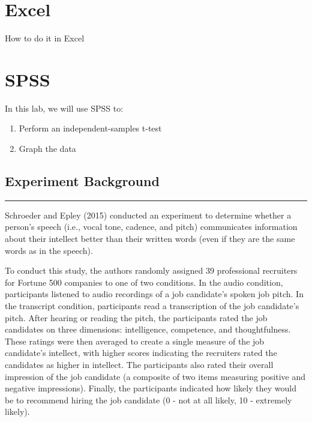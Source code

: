 \documentclass[
]{book}
\providecommand{\tightlist}{%
  \setlength{\itemsep}{0pt}\setlength{\parskip}{0pt}}
\begin{document}
\hypertarget{excel-7}{%
\section{Excel}\label{excel-7}}

How to do it in Excel

\hypertarget{spss-7}{%
\section{SPSS}\label{spss-7}}

In this lab, we will use SPSS to:

\begin{enumerate}
\def\labelenumi{\arabic{enumi}.}
\tightlist
\item
  Perform an independent-samples t-test
\item
  Graph the data
\end{enumerate}

\hypertarget{experiment-background-2}{%
\subsection{Experiment Background}\label{experiment-background-2}}

\begin{center}\rule{0.5\linewidth}{0.5pt}\end{center}

Schroeder and Epley (2015) conducted an experiment to determine whether a person's speech (i.e., vocal tone, cadence, and pitch) communicates information about their intellect better than their written words (even if they are the same words as in the speech).

To conduct this study, the authors randomly assigned 39 professional recruiters for Fortune 500 companies to one of two conditions. In the audio condition, participants listened to audio recordings of a job candidate's spoken job pitch. In the transcript condition, participants read a transcription of the job candidate's pitch. After hearing or reading the pitch, the participants rated the job candidates on three dimensions: intelligence, competence, and thoughtfulness. These ratings were then averaged to create a single measure of the job candidate's intellect, with higher scores indicating the recruiters rated the candidates as higher in intellect. The participants also rated their overall impression of the job candidate (a composite of two items measuring positive and negative impressions). Finally, the participants indicated how likely they would be to recommend hiring the job candidate (0 - not at all likely, 10 - extremely likely).
\end{document}

